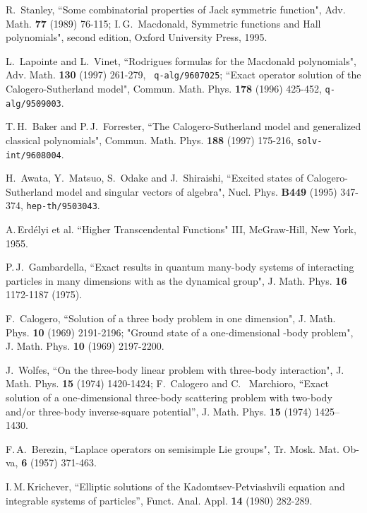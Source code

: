 \documentclass[a4paper,12pt]{article}
\begin{document}
\begin{thebibliography}{99}
R.\, Stanley, ``Some combinatorial properties of Jack symmetric function",
Adv. Math. {\bf 77} (1989) 76-115; I.\,G.\, Macdonald, Symmetric
functions and Hall polynomials", second edition, Oxford University Press,
1995.


L.\, Lapointe and L.\, Vinet, ``Rodrigues formulas for the Macdonald
polynomials",  Adv. Math. {\bf 130}  (1997) 261-279, {\tt
q-alg/9607025}; ``Exact operator solution of the Calogero-Sutherland
model", Commun. Math. Phys. {\bf 178} (1996) 425-452,
{\tt q-alg/9509003}.

T.\,H.\, Baker and P.\,J.\, Forrester, ``The Calogero-Sutherland model
and
generalized classical polynomials", Commun. Math. Phys. {\bf 188}
(1997) 175-216, {\tt solv-int/9608004}.

H.\, Awata, Y.\, Matsuo, S.\, Odake and J.\, Shiraishi,
``Excited states of Calogero-Sutherland model and singular vectors of
\coordHE{} algebra",
Nucl. Phys. {\bf B449} (1995) 347-374, {\tt hep-th/9503043}.

 A.\,Erd\'elyi et al. ``Higher Transcendental
Functions" III, McGraw-Hill, New York, 1955.



P.\,J.\, Gambardella, ``Exact results in quantum many-body systems of
interacting particles in many dimensions with \coordHE{} as the
dynamical group",
J. Math. Phys. {\bf 16} 1172-1187 (1975).

F.\, Calogero, ``Solution of a three body problem in one dimension",
J. Math. Phys. {\bf 10} (1969) 2191-2196;
"Ground state of a one-dimensional \coordHE{}-body problem",
J. Math. Phys. {\bf 10} (1969) 2197-2200.


J.~Wolfes, ``On the three-body linear problem with three-body
interaction", J. Math. Phys. {\bf 15} (1974) 1420-1424;
F.~Calogero and C. ~Marchioro, ``Exact solution of a one-dimensional
three-body scattering problem with two-body and/or three-body
inverse-square potential'', J. Math. Phys. {\bf 15}
  (1974) 1425--1430.


F.\,A.\, Berezin, ``Laplace operators on semisimple Lie groups",
Tr. Mosk. Mat. Ob-va, {\bf 6} (1957) 371-463.



I.\,M.\,Krichever, ``Elliptic solutions of the
Kadomtsev-Petviashvili equation and integrable systems of particles'',
Funct. Anal. Appl. {\bf 14} (1980) 282-289.




\end{thebibliography}
\end{document}
